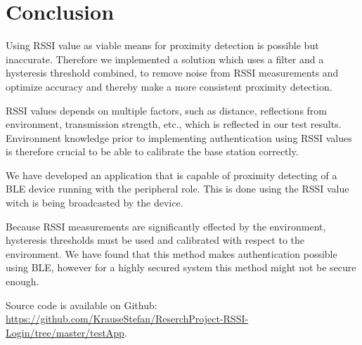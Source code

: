 \section{Conclusion}
Using RSSI value as viable means for proximity detection is possible but inaccurate. Therefore we implemented a solution which uses a filter and a hysteresis threshold combined, to remove noise from RSSI measurements and optimize accuracy and thereby make a more consistent proximity detection.

RSSI values depends on multiple factors, such as distance, reflections from environment, transmission strength, etc., which is reflected in our test results.
Environment knowledge prior to implementing authentication using RSSI values is therefore crucial to be able to calibrate the base station correctly.

We have developed an application that is capable of proximity detecting of a BLE device running with the peripheral role. This is done using the RSSI value witch is being broadcasted by the device.

Because RSSI measurements are significantly effected by the environment, hysteresis thresholds must be used and calibrated with respect to the environment.
We have found that this method makes authentication possible using BLE, however for a highly secured system this method might not be secure enough.

Source code is available on Github:
\url{https://github.com/KrauseStefan/ReserchProject-RSSI-Login/tree/master/testApp}.

%

